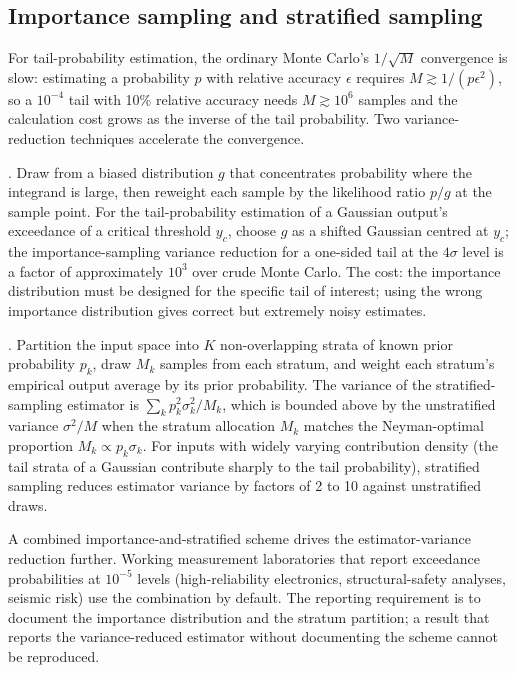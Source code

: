 \subsection{Importance sampling and stratified sampling}

For tail-probability estimation, the ordinary Monte Carlo's
$1/\sqrt{M}$ convergence is slow: estimating a probability $p$ with
relative accuracy $\epsilon$ requires $M \gtrsim 1/(p \epsilon^{2})$,
so a $10^{-4}$ tail with 10\% relative accuracy needs $M \gtrsim
10^{6}$ samples and the calculation cost grows as the inverse of
the tail probability. Two variance-reduction techniques accelerate
the convergence.

. Draw from a biased distribution $g$
that concentrates probability where the integrand is large, then
reweight each sample by the likelihood ratio $p/g$ at the sample
point. For the tail-probability estimation of a Gaussian output's
exceedance of a critical threshold $y_{c}$, choose $g$ as a shifted
Gaussian centred at $y_{c}$; the importance-sampling variance
reduction for a one-sided tail at the $4\sigma$ level is a factor
of approximately $10^{3}$ over crude Monte Carlo. The cost: the
importance distribution must be designed for the specific tail of
interest; using the wrong importance distribution gives correct but
extremely noisy estimates.

. Partition the input space into $K$
non-overlapping strata of known prior probability $p_{k}$, draw
$M_{k}$ samples from each stratum, and weight each stratum's
empirical output average by its prior probability. The variance
of the stratified-sampling estimator is
$\sum_{k} p_{k}^{2} \sigma_{k}^{2}/M_{k}$, which is bounded above
by the unstratified variance $\sigma^{2}/M$ when the stratum
allocation $M_{k}$ matches the Neyman-optimal proportion
$M_{k} \propto p_{k} \sigma_{k}$. For inputs with widely varying
contribution density (the tail strata of a Gaussian contribute
sharply to the tail probability), stratified sampling reduces
estimator variance by factors of 2 to 10 against unstratified
draws.

A combined importance-and-stratified scheme drives the
estimator-variance reduction further. Working measurement
laboratories that report exceedance probabilities at $10^{-5}$
levels (high-reliability electronics, structural-safety analyses,
seismic risk) use the combination by default. The reporting
requirement is to document the importance distribution and the
stratum partition; a result that reports the variance-reduced
estimator without documenting the scheme cannot be reproduced.

